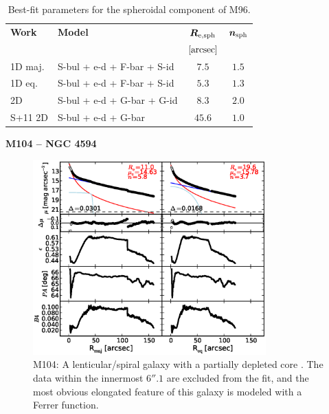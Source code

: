\documentclass[preprint2]{emulateapj}
\newcommand{\fitfigurewidth}{0.8\textwidth}
\begin{document}
  \begin{table}[h]
  \small
  \caption{Best-fit parameters for the spheroidal component of M96.}
  \begin{center}
  \begin{tabular}{llcc}
  \hline
  {\bf Work} & {\bf Model}   & $\bm R_{\rm e,sph}$    & $\bm n_{\rm sph}$ \\
    &  &  $[\rm arcsec]$ & \\
  \hline
  1D maj. & S-bul + e-d + F-bar + S-id  & $7.5$  &  $1.5$ \\
  1D eq.  & S-bul + e-d + F-bar + S-id  & $5.3$  &  $1.3$ \\
  2D      & S-bul + e-d + G-bar + G-id  & $8.3$  &  $2.0$ \\
  \hline
  S+11 2D         & S-bul + e-d + G-bar  & $45.6$  &  $1.0$ \\
  \hline
  \end{tabular}
  \end{center}
  \label{tab:m96}
  \end{table}


  \clearpage\newpage\noindent

  {\bf M104 -- NGC 4594 \\} 

  \begin{figure}[h]
  \begin{center}
  \includegraphics[width=\fitfigurewidth]{images/m104_1Dfit.eps}
  \caption{M104: 
  A lenticular/spiral galaxy with a partially depleted core \citep{jardel2011}. 
  The data within the innermost $6''.1$ are excluded from the fit, 
  and the most obvious elongated feature of this galaxy is modeled with a Ferrer function.
  }
  \end{center}
  \end{figure}
  
\end{document}
